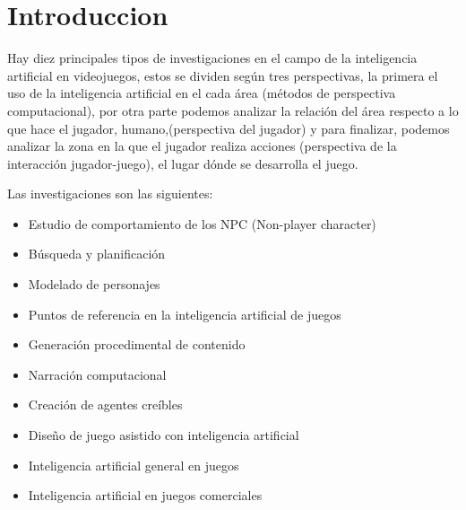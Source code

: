 %
%

\chapter[Introduccion]{
	Introduccion
}

Hay diez principales tipos de investigaciones en el campo de la inteligencia artificial en videojuegos, estos se dividen según tres perspectivas, la primera el uso de la inteligencia artificial en el cada área (métodos de perspectiva computacional), por otra parte podemos analizar la relación del área respecto a lo que hace el jugador, humano,(perspectiva del jugador) y para finalizar, podemos analizar la zona en la que el jugador realiza acciones (perspectiva de la interacción jugador-juego), el lugar dónde se desarrolla el juego.\cite{B1}


Las investigaciones son las siguientes:

\begin{center}

	\begin{itemize}
	
		\item Estudio de comportamiento de los NPC (Non-player character)\\
		\item Búsqueda y planificación\\
		\item Modelado de personajes\\
		\item Puntos de referencia en la inteligencia artificial de juegos\\
		\item Generación procedimental de contenido\\
		\item Narración computacional\\
		\item Creación de agentes creíbles\\
		\item Diseño de juego asistido con inteligencia artificial\\
		\item Inteligencia artificial general en juegos\\
		\item Inteligencia artificial en juegos comerciales\\
		
	\end{itemize}

\end{center}


